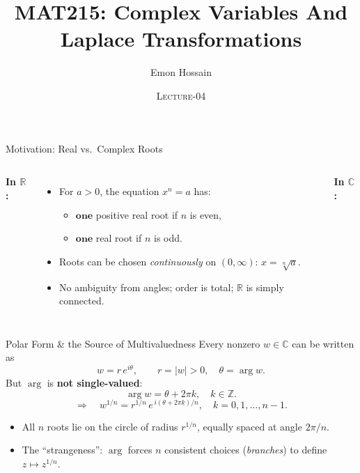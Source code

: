 \documentclass[11pt]{beamer}
\author[] %
{Emon Hossain\inst{1}}
\institute[University of Dhaka] %
{
  \inst{1}%
  Lecturer\\MNS department\\Brac University
}
\date[] %
{\textsc{Lecture-04}}
\title[]{MAT215: Complex Variables And Laplace Transformations}
\theoremstyle{plain}
\newcommand{\C}{\mathbb{C}}
\newcommand{\R}{\mathbb{R}}
\begin{document}
\begin{frame}
\titlepage
\end{frame}


\begin{frame}{Motivation: Real vs.\ Complex Roots}
\begin{columns}[T,onlytextwidth]
\textbf{In \(\R\):}
\begin{itemize}
  \item For \(a>0\), the equation \(x^n=a\) has:
  \begin{itemize}
    \item \(\textbf{one}\) positive real root if \(n\) is even,
    \item \(\textbf{one}\) real root if \(n\) is odd.
  \end{itemize}
  \item Roots can be chosen \textit{continuously} on \((0,\infty)\): \(x=\sqrt[n]{a}\).
  \item No ambiguity from angles; order is total; \(\R\) is simply connected.
\end{itemize}

\textbf{In \(\C\):}
\end{columns}
\end{frame}

\begin{frame}{Polar Form \& the Source of Multivaluedness}
Every nonzero \(w\in\C\) can be written as
\[
w = r\,e^{i\theta}, \qquad r=|w|>0,\quad \theta=\arg w.
\]
But \(\arg\) is \textbf{not single-valued}:
\[
\arg w = \theta + 2\pi k,\quad k\in\mathbb{Z}.
\]
\pause
\[
\Rightarrow\quad w^{1/n} = r^{1/n}\, e^{\,i(\theta+2\pi k)/n},\quad k=0,1,\dots,n-1.
\]
\begin{itemize}
  \item All \(n\) roots lie on the circle of radius \(r^{1/n}\), equally spaced at angle \(2\pi/n\).
  \item The ``strangeness'': \(\arg\) forces \(n\) consistent choices (\textit{branches}) to define \(z\mapsto z^{1/n}\).
\end{itemize}
\end{frame}
\end{document}
